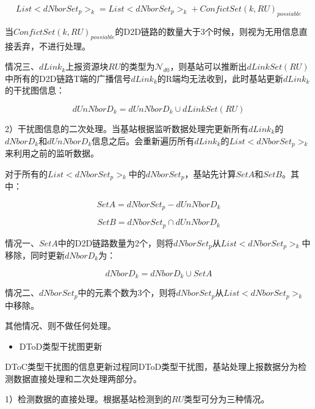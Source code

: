 \documentclass[figurelist,tablelist,algorithmlist,nomlist,masters]{seuthesix}
\begin{document}
	\begin{equation}\label{eq2.16}
	List < dNborSet_{p}{ > _k} = List < dNborSet_{p}{ > _k} + ConfictSet{(k,RU)_{possiable}}
	\end{equation}
	
	当$ConfictSet{(k,RU)_{possiable}}$的D2D链路的数量大于3个时候，则视为无用信息直接丢弃，不进行处理。
	
	
	情况三、$dLink_k$上报资源块$RU$的类型为$\mathcal{N}_{d0}$，则基站可以推断出$dLinkSet(RU)$中所有的D2D链路T端的广播信号$dLink_k$的R端均无法收到，此时基站更新$dLink_k$的干扰图信息：
	
	\begin{equation}\label{eq2.17}
	dUnNborD_k = dUnNborD_k \cup dLinkSet(RU)
	\end{equation}
	
	2）干扰图信息的二次处理。当基站根据监听数据处理完更新所有$dLink_k$的$dNborD_k$和$dUnNborD_k$信息之后。会重新遍历所有$dLink_k$的$List < dNborSet_{p}{ > _k}$来利用之前的监听数据。
	
	对于所有的$List < dNborSet_{p}{ > _k}$中的$dNborSet_{p}$，基站先计算$SetA$和$SetB$。其中：
	
	\begin{equation}\label{eq2.18}
	SetA = dNborSet_{p} - dUnNborD_k
	\end{equation}
	
	\begin{equation}\label{eq2.19}
	SetB = dNborSet_{p} \cap dUnNborD_k
	\end{equation}
	
	情况一、$SetA$中的D2D链路数量为2个，则将$dNborSet_{p}$从$List < dNborSet_{p}{ > _k}$中移除，同时更新$dNborD_k$为：
	
	\begin{equation}\label{eq2.20}
	dNborD_k = dNborD_k \cup SetA
	\end{equation}
	
	情况二、$dNborSet_{p}$中的元素个数为3个，则将$dNborSet_{p}$从$List < dNborSet_{p}{ > _k}$中移除。
	
	其他情况、则不做任何处理。
	
	
	\begin{itemize}
		\item DToD类型干扰图更新
	\end{itemize}
	
	DToC类型干扰图的信息更新过程同DToD类型干扰图，基站处理上报数据分为检测数据直接处理和二次处理两部分。
	
	1）检测数据的直接处理。根据基站检测到的$RU$类型可分为三种情况。
	
\end{document}
